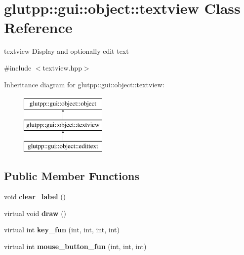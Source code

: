 \hypertarget{classglutpp_1_1gui_1_1object_1_1textview}{\section{glutpp\-:\-:gui\-:\-:object\-:\-:textview \-Class \-Reference}
\label{classglutpp_1_1gui_1_1object_1_1textview}
}


textview \-Display and optionally edit text  




{\ttfamily \#include $<$textview.\-hpp$>$}

\-Inheritance diagram for glutpp\-:\-:gui\-:\-:object\-:\-:textview\-:\begin{figure}[H]
\begin{center}
\leavevmode
\includegraphics[height=3.000000cm]{classglutpp_1_1gui_1_1object_1_1textview}
\end{center}
\end{figure}
\subsection*{\-Public \-Member \-Functions}
\begin{DoxyCompactItemize}
\item 
\hypertarget{classglutpp_1_1gui_1_1object_1_1textview_a926a96c785895a5c6a5e18c341b3e19f}{void {\bfseries clear\-\_\-label} ()}\label{classglutpp_1_1gui_1_1object_1_1textview_a926a96c785895a5c6a5e18c341b3e19f}

\item 
\hypertarget{classglutpp_1_1gui_1_1object_1_1textview_a535f913bc264bd4bb4072777109a1dc2}{virtual void {\bfseries draw} ()}\label{classglutpp_1_1gui_1_1object_1_1textview_a535f913bc264bd4bb4072777109a1dc2}

\item 
\hypertarget{classglutpp_1_1gui_1_1object_1_1textview_ae100e01abe28a1028432c40a90348b01}{virtual int {\bfseries key\-\_\-fun} (int, int, int, int)}\label{classglutpp_1_1gui_1_1object_1_1textview_ae100e01abe28a1028432c40a90348b01}

\item 
\hypertarget{classglutpp_1_1gui_1_1object_1_1textview_ad4b0c55f05105dc27621052c479956fd}{virtual int {\bfseries mouse\-\_\-button\-\_\-fun} (int, int, int)}\label{classglutpp_1_1gui_1_1object_1_1textview_ad4b0c55f05105dc27621052c479956fd}

\end{DoxyCompactItemize}
